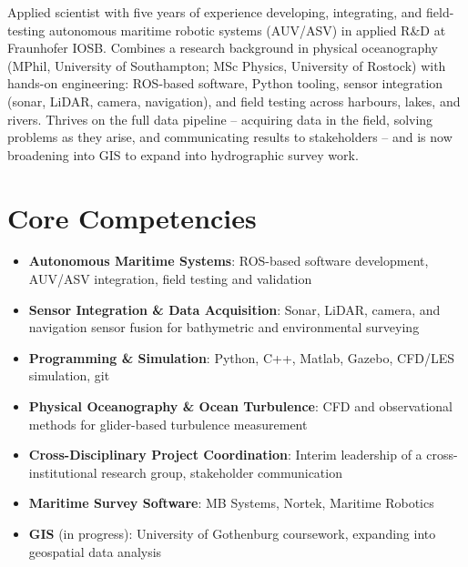 \documentclass[11pt,a4paper,sans]{moderncv}
\begin{document}
\makecvtitle


\vspace{6pt}
\small{Applied scientist with five years of experience developing, integrating, and field-testing autonomous maritime robotic systems (AUV/ASV) in applied R\&D at Fraunhofer IOSB. Combines a research background in physical oceanography (MPhil, University of Southampton; MSc Physics, University of Rostock) with hands-on engineering: ROS-based software, Python tooling, sensor integration (sonar, LiDAR, camera, navigation), and field testing across harbours, lakes, and rivers. Thrives on the full data pipeline -- acquiring data in the field, solving problems as they arise, and communicating results to stakeholders -- and is now broadening into GIS to expand into hydrographic survey work.}


\section{Core Competencies}
\vspace{1pt}
\begin{itemize}

\item \textbf{Autonomous Maritime Systems}: ROS-based software development, AUV/ASV integration, field testing and validation

\item \textbf{Sensor Integration \& Data Acquisition}: Sonar, LiDAR, camera, and navigation sensor fusion for bathymetric and environmental surveying

\item \textbf{Programming \& Simulation}: Python, C++, Matlab, Gazebo, CFD/LES simulation, git

\item \textbf{Physical Oceanography \& Ocean Turbulence}: CFD and observational methods for glider-based turbulence measurement

\item \textbf{Cross-Disciplinary Project Coordination}: Interim leadership of a cross-institutional research group, stakeholder communication

\item \textbf{Maritime Survey Software}: MB Systems, Nortek, Maritime Robotics

\item \textbf{GIS} (in progress): University of Gothenburg coursework, expanding into geospatial data analysis

\end{itemize}
\end{document}
